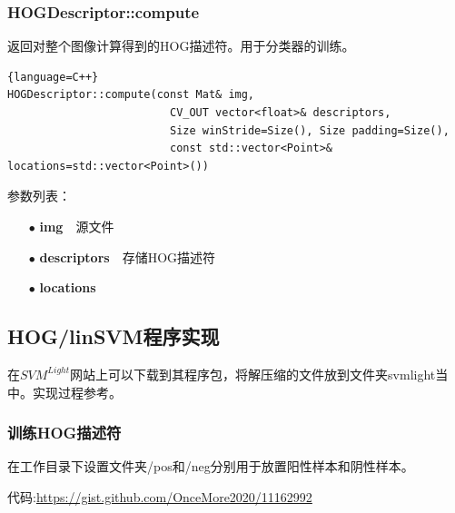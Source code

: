 \documentclass[10pt,technote,onecolumn,twoside]{IEEEtran}
\begin{document}
\subsubsection{HOGDescriptor::compute}
返回对整个图像计算得到的HOG描述符。用于分类器的训练。
\begin{lstlisting}{language=C++}
HOGDescriptor::compute(const Mat& img,
                         CV_OUT vector<float>& descriptors,
                         Size winStride=Size(), Size padding=Size(),
                         const std::vector<Point>& locations=std::vector<Point>())
\end{lstlisting}
参数列表：
\begin{enumerate}
\item[$\bullet$]\textbf{img}~~源文件
\item[$\bullet$]\textbf{descriptors}~~存储HOG描述符
\item[$\bullet$]\textbf{locations}~~
\end{enumerate}

\subsection{HOG/linSVM程序实现}
在$SVM^{Light}$网站上可以下载到其程序包，将解压缩的文件放到文件夹\textsf{svmlight}当中。实现过程参考\cite{bib8}。
\subsubsection{训练HOG描述符}
在工作目录下设置文件夹\textsf{/pos}和\textsf{/neg}分别用于放置阳性样本和阴性样本。

代码:\url{https://gist.github.com/OnceMore2020/11162992}

%


\end{document}
